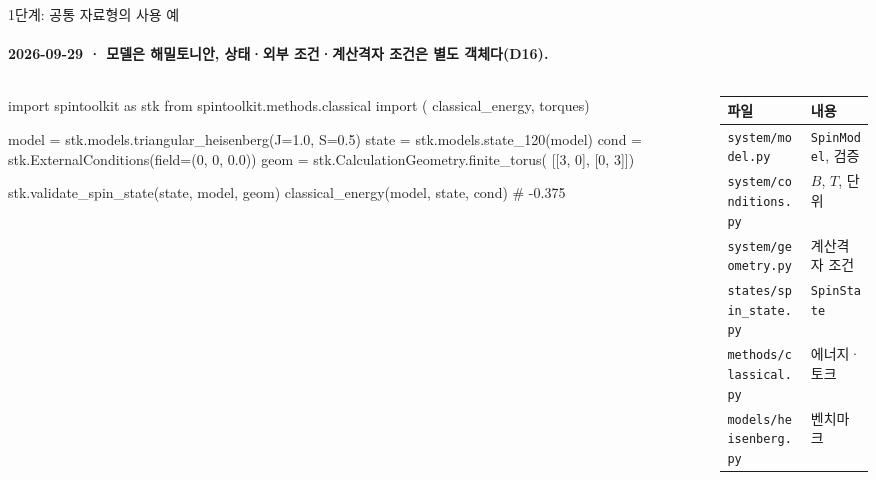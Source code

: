 \begin{frame}[fragile,label=stage1-api]{1단계: 공통 자료형의 사용 예}
  \framesubtitle{2026-09-29 · 모델은 해밀토니안, 상태·외부 조건·계산격자 조건은 별도 객체다(D16).}
  \begin{columns}[T,onlytextwidth]
    \begin{column}{0.56\textwidth}
\begin{semiverbatim}\scriptsize
import spintoolkit as stk
from spintoolkit.methods.classical import (
    classical_energy, torques)

model = stk.models.triangular_heisenberg(J=1.0, S=0.5)
state = stk.models.state_120(model)
cond  = stk.ExternalConditions(field=(0, 0, 0.0))
geom  = stk.CalculationGeometry.finite_torus(
            [[3, 0], [0, 3]])

stk.validate_spin_state(state, model, geom)
classical_energy(model, state, cond)  # -0.375
\end{semiverbatim}
    \end{column}
    \begin{column}{0.40\textwidth}
      \small
      \begin{tabular}{@{}ll@{}}
        \toprule
        파일 & 내용 \\
        \midrule
        \texttt{system/model.py} & \texttt{SpinModel}, 검증 \\
        \texttt{system/conditions.py} & $B$, $T$, 단위 \\
        \texttt{system/geometry.py} & 계산격자 조건 \\
        \texttt{states/spin\_state.py} & \texttt{SpinState} \\
        \texttt{methods/classical.py} & 에너지·토크 \\
        \texttt{models/heisenberg.py} & 벤치마크 \\
        \bottomrule
      \end{tabular}
    \end{column}
  \end{columns}
  \par\medskip
\end{frame}

